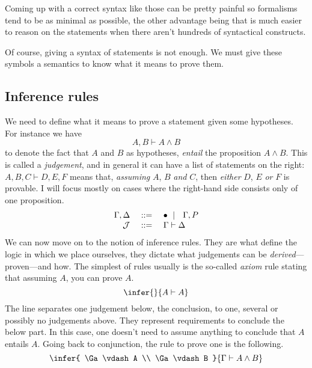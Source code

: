 Coming up with a correct syntax like those can be pretty painful so formalisms
tend to be as minimal as possible, the other advantage being that is much easier
to reason on the statements when there aren't hundreds of syntactical
constructs.

Of course, giving a syntax of statements is not enough. We must give these
symbols a semantics to know what it means to prove them.

\subsection{Inference rules}

We need to define what it means to prove a statement given some hypotheses.
For instance we have
\[
  A, B \vdash A \wedge B
\]
to denote the fact that \(A\) and \(B\) as hypotheses, \emph{entail} the
proposition \(A \wedge B\).
This is called a \emph{judgement}, and in general it can have a list of
statements on the right: \(A, B, C \vdash D, E, F\) means that, \emph{assuming}
\(A\), \(B\) \emph{and} \(C\), then \emph{either} \(D\), \(E\) \emph{or} \(F\)
is provable.
I will focus mostly on cases where the right-hand side consists only
of one proposition.
\[
  \begin{array}{rcl}
    \Gamma, \Delta &\ \mathrel{{:}{:}{=}}\ & \bullet \ \mid\ \  \Gamma, P \\
    \mathcal{J} &\ \mathrel{{:}{:}{=}}\ & \Gamma \vdash \Delta
  \end{array}
\]
We can now move on to the notion of inference rules. They are what define the
logic in which we place ourselves, they dictate what judgements can be
\emph{derived}---\ie proven---and how.
The simplest of rules usually is the so-called \emph{axiom} rule stating that
assuming \(A\), you can prove \(A\).
\[
  \infer
    { }
    {A \vdash A}
\]
The line separates one judgement below, the conclusion, to one, several or
possibly no judgements above. They represent requirements to conclude the below
part. In this case, one doesn't need to assume anything to conclude that \(A\)
entails \(A\).
Going back to conjunction, the rule to prove one is the following.
\[
  \infer
    {
      \Ga \vdash A \\
      \Ga \vdash B
    }
    {\Ga \vdash A \wedge B}
\]
